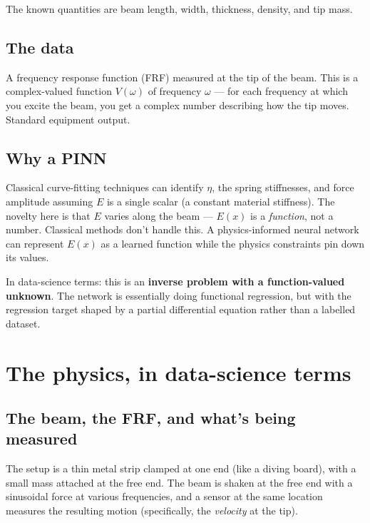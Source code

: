 \documentclass[11pt,a4paper]{article}
\begin{document}
The known quantities are beam length, width, thickness, density, and tip mass.

\subsection{The data}

A frequency response function (FRF) measured at the tip of the beam. This is a complex-valued function $V(\omega)$ of frequency $\omega$ --- for each frequency at which you excite the beam, you get a complex number describing how the tip moves. Standard equipment output.

\subsection{Why a PINN}

Classical curve-fitting techniques can identify $\eta$, the spring stiffnesses, and force amplitude assuming $E$ is a single scalar (a constant material stiffness). The novelty here is that $E$ varies along the beam --- $E(x)$ is a \emph{function}, not a number. Classical methods don't handle this. A physics-informed neural network can represent $E(x)$ as a learned function while the physics constraints pin down its values.

In data-science terms: this is an \textbf{inverse problem with a function-valued unknown}. The network is essentially doing functional regression, but with the regression target shaped by a partial differential equation rather than a labelled dataset.

\section{The physics, in data-science terms}

\subsection{The beam, the FRF, and what's being measured}

The setup is a thin metal strip clamped at one end (like a diving board), with a small mass attached at the free end. The beam is shaken at the free end with a sinusoidal force at various frequencies, and a sensor at the same location measures the resulting motion (specifically, the \emph{velocity} at the tip).
\end{document}
